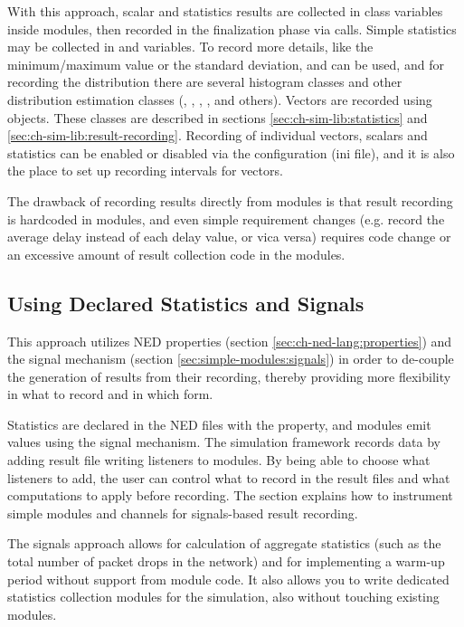 With this approach, scalar and statistics results are collected in class
variables inside modules, then recorded in the finalization phase via
 calls. Simple statistics may be collected in
 and  variables. To record more details, like the
minimum/maximum value or the standard deviation,  and
 can be used, and for recording the distribution
there are several histogram classes and other distribution estimation
classes (, ,
, , and others). Vectors are recorded
using  objects. These classes are described in sections
\ref{sec:ch-sim-lib:statistics} and \ref{sec:ch-sim-lib:result-recording}.
Recording of individual vectors, scalars and statistics can be enabled or
disabled via the configuration (ini file), and it is also the place to set
up recording intervals for vectors.

The drawback of recording results directly from modules is that result
recording is hardcoded in modules, and even simple requirement changes
(e.g. record the average delay instead of each delay value, or vica versa)
requires code change or an excessive amount of result collection code
in the modules.

\subsection{Using Declared Statistics and Signals}

This approach utilizes NED properties (section
\ref{sec:ch-ned-lang:properties}) and the signal mechanism (section
\ref{sec:simple-modules:signals}) in order to de-couple the generation of
results from their recording, thereby providing more flexibility in what to
record and in which form.

Statistics are declared in the NED files with the  property,
and modules emit values using the signal mechanism. The simulation
framework records data by adding result file writing listeners to modules.
By being able to choose what listeners to add, the user can control what to
record in the result files and what computations to apply before recording.
The section \label{sec:ch-simple-modules:statistic-signals} explains how to
instrument simple modules and channels for signals-based result recording.

The signals approach allows for calculation of aggregate statistics (such as the
total number of packet drops in the network) and for implementing a warm-up
period without support from module code. It also allows you to write
dedicated statistics collection modules for the simulation, also without
touching existing modules.


